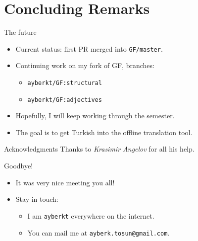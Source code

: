 \documentclass{beamer}
\begin{document}
  \section{Concluding Remarks}

  \begin{frame}{The future}
    \begin{itemize}
      \item<1-> Current status: first PR merged into \texttt{GF/master}.
      \item<2-> Continuing work on my fork of GF, branches:
        \begin{itemize}
          \item<2-> \texttt{ayberkt/GF:structural}
          \item<2-> \texttt{ayberkt/GF:adjectives}
        \end{itemize}
      \item<3-> Hopefully, I will keep working through the semester.
      \item<4-> The goal is to get Turkish into the offline translation tool.
    \end{itemize}
  \end{frame}

  \begin{frame}{Acknowledgments}
    \Large
      Thanks to \emph{Krasimir Angelov} for all his help.
  \end{frame}

  \begin{frame}{Goodbye!}
    \begin{itemize}
    \item<1-> \alert{It was very nice meeting you all!}
    \item<2-> Stay in touch:
      \begin{itemize}
        \item<3-> I am \alert{\texttt{ayberkt}} everywhere on the internet.
        \item<4-> You can mail me at \texttt{ayberk.tosun@gmail.com}.
      \end{itemize}
    \end{itemize}
  \end{frame}

  
  
\end{document}
